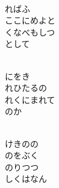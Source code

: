 \documentclass[10pt,b5j]{tarticle} %
\begin{document}
\begin{enumerate}
\begin{minipage}[c]{\blocksize}
    \end{minipage}
    \begin{minipage}[c]{\blocksize}
        
        \vspace{\linespace}
        \item~\\
        ればふ\\
        ここにめよと\\
        くなべもしつ\\
        として
        
    \end{minipage}
    \begin{minipage}[c]{\blocksize}
        
        \vspace{\linespace}
        \item~\\
        にをき\\
        れひたるの\\
        れくにまれて\\
        のか
        
    \end{minipage}
    \begin{minipage}[c]{\blocksize}
        
        \vspace{\linespace}
        \item~\\
        けきのの\\
        のをぶく\\
        のりつつ\\
        しくはなん
        
    \end{minipage}
    \begin{minipage}[c]{\blocksize}
        

\end{minipage}
\end{enumerate}
\end{document}
